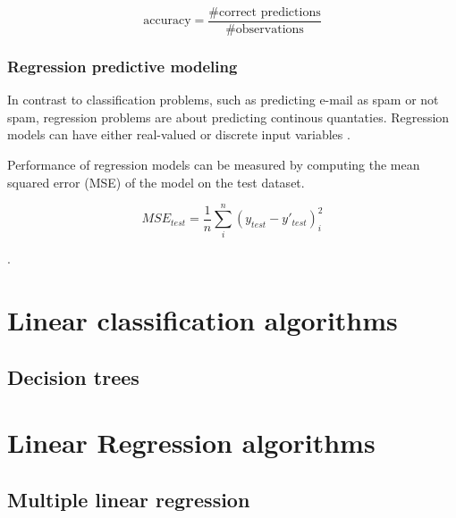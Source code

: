 \begin{equation}
	\mbox{accuracy} = \frac{\mbox{\#correct predictions}}{\mbox{\#observations}}
\end{equation}
	
\subsubsection{Regression predictive modeling}
	In contrast to classification problems, such as predicting e-mail as spam or not spam, regression problems are about predicting continous quantaties. Regression models can have either real-valued or discrete input variables \cite{WEBSITE:8}. 

Performance of regression models can be measured by computing the mean squared error (MSE) of the model on the test dataset. 

\begin{equation}
	MSE_{test} = \frac{1}{n} \sum_{i}^{n}(y_{test} - y'_{test})_{i}^2
\end{equation}

 \cite{BOOK:1}. 



\section{Linear classification algorithms}
\subsection{Decision trees}

\section{Linear Regression algorithms}
\subsection{Multiple linear regression} \label{sec:mul-lin-reg}

